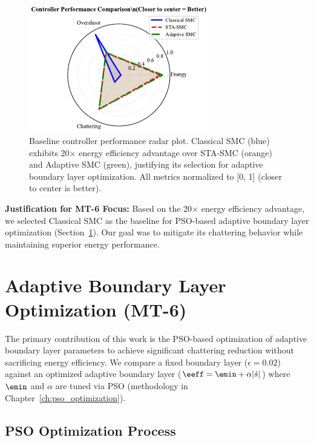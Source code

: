 \begin{figure}[t]
\centering
\includegraphics[width=0.7\textwidth]{../figures/fig3_baseline_radar.pdf}
\caption{Baseline controller performance radar plot. Classical SMC (blue) exhibits 20$\times$ energy efficiency advantage over STA-SMC (orange) and Adaptive SMC (green), justifying its selection for adaptive boundary layer optimization. All metrics normalized to [0, 1] (closer to center is better).}
\label{fig:baseline_radar}
\end{figure}

\textbf{Justification for MT-6 Focus:} Based on the 20$\times$ energy efficiency advantage, we selected Classical SMC as the baseline for PSO-based adaptive boundary layer optimization (Section~\ref{sec:mt6_results}). Our goal was to mitigate its chattering behavior while maintaining superior energy performance.

\section{Adaptive Boundary Layer Optimization (MT-6)}
\label{sec:mt6_results}

The primary contribution of this work is the PSO-based optimization of adaptive boundary layer parameters to achieve significant chattering reduction without sacrificing energy efficiency. We compare a fixed boundary layer ($\epsilon = 0.02$) against an optimized adaptive boundary layer ($\eeff = \emin + \alpha|\dot{s}|$) where $\emin$ and $\alpha$ are tuned via PSO (methodology in Chapter~\ref{ch:pso_optimization}).

\subsection{PSO Optimization Process}
\label{subsec:pso_process}


